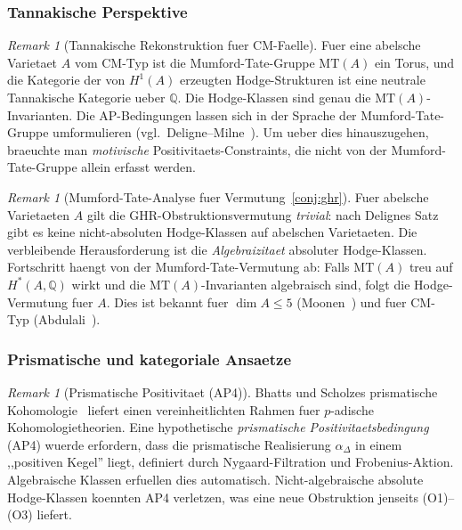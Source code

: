 \documentclass[aps,prd,twocolumn,superscriptaddress,nofootinbib]{revtex4-2}
\theoremstyle{definition}
\theoremstyle{remark}
\newtheorem{remark}[theorem]{Remark}
\begin{document}
\subsubsection{Tannakische Perspektive}

\begin{remark}[Tannakische Rekonstruktion fuer CM-Faelle]
\label{rem:tannakian}
Fuer eine abelsche Varietaet $A$ vom CM-Typ ist die Mumford-Tate-Gruppe $\mathrm{MT}(A)$ ein Torus, und die Kategorie der von $H^1(A)$ erzeugten Hodge-Strukturen ist eine neutrale Tannakische Kategorie ueber $\mathbb{Q}$. Die Hodge-Klassen sind genau die $\mathrm{MT}(A)$-Invarianten. Die AP-Bedingungen lassen sich in der Sprache der Mumford-Tate-Gruppe umformulieren (vgl.\ Deligne--Milne~\cite{DeligneMilne1982}). Um ueber dies hinauszugehen, braeuchte man \textit{motivische} Positivitaets-Constraints, die nicht von der Mumford-Tate-Gruppe allein erfasst werden.
\end{remark}

\begin{remark}[Mumford-Tate-Analyse fuer Vermutung~\ref{conj:ghr}]
\label{rem:mumford-tate-ghr}
Fuer abelsche Varietaeten $A$ gilt die GHR-Obstruktionsvermutung \textit{trivial}: nach Delignes Satz gibt es keine nicht-absoluten Hodge-Klassen auf abelschen Varietaeten. Die verbleibende Herausforderung ist die \textit{Algebraizitaet} absoluter Hodge-Klassen. Fortschritt haengt von der Mumford-Tate-Vermutung ab: Falls $\mathrm{MT}(A)$ treu auf $H^*(A, \mathbb{Q})$ wirkt und die $\mathrm{MT}(A)$-Invarianten algebraisch sind, folgt die Hodge-Vermutung fuer $A$. Dies ist bekannt fuer $\dim A \leq 5$ (Moonen~\cite{Moonen1999}) und fuer CM-Typ (Abdulali~\cite{Abdulali1994}).
\end{remark}

\subsubsection{Prismatische und kategoriale Ansaetze}

\begin{remark}[Prismatische Positivitaet (AP4)]
\label{rem:prismatic}
Bhatts und Scholzes prismatische Kohomologie~\cite{BhattScholze2022} liefert einen vereinheitlichten Rahmen fuer $p$-adische Kohomologietheorien. Eine hypothetische \textit{prismatische Positivitaetsbedingung} (AP4) wuerde erfordern, dass die prismatische Realisierung $\alpha_{\Delta}$ in einem ,,positiven Kegel'' liegt, definiert durch Nygaard-Filtration und Frobenius-Aktion. Algebraische Klassen erfuellen dies automatisch. Nicht-algebraische absolute Hodge-Klassen koennten AP4 verletzen, was eine neue Obstruktion jenseits (O1)--(O3) liefert.
\end{remark}
\end{document}
